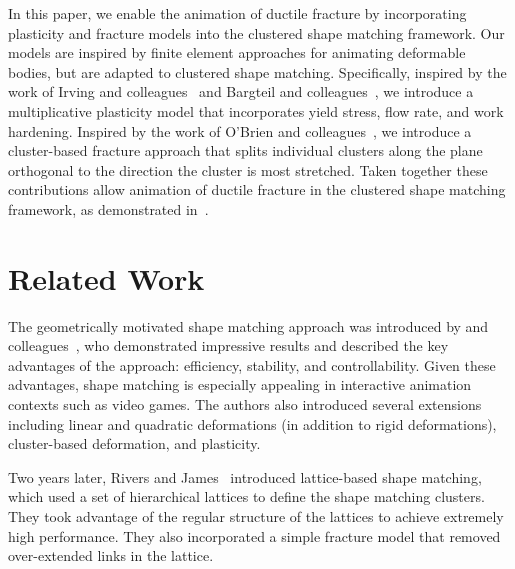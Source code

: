 \documentclass[conference]{acmsiggraph}
\begin{document}
In this paper, we enable the animation of ductile fracture 
by incorporating plasticity and fracture models into the clustered shape matching framework.
Our models are inspired by finite element approaches for animating deformable bodies, but are adapted to 
clustered shape matching.
Specifically, inspired by the work of Irving and colleagues~ and Bargteil and 
colleagues~, we introduce a multiplicative plasticity model that incorporates
yield stress, flow rate, and work hardening.  Inspired by the work of O'Brien and colleagues~,
we introduce a cluster-based fracture approach that splits individual clusters along the plane orthogonal to the direction the 
cluster is most stretched.
Taken together these contributions allow animation of ductile fracture in the clustered shape matching framework, as demonstrated
in~.

\section{Related Work}
The geometrically motivated shape matching approach was introduced by \Mueller and 
colleagues~, who demonstrated impressive results and 
described the key advantages of the approach: efficiency, stability, and controllability.
Given these advantages, shape matching is especially appealing in interactive animation contexts such as
video games.  The authors also introduced several extensions including linear and quadratic deformations 
(in addition to rigid deformations), cluster-based deformation, and plasticity.  

Two years later, Rivers and James~ introduced lattice-based shape matching,
which used a set of hierarchical lattices to define the shape matching clusters.  They took advantage
of the regular structure of the lattices to achieve extremely high performance.  They also incorporated a 
simple fracture model that removed over-extended links in the lattice.  
\end{document}
